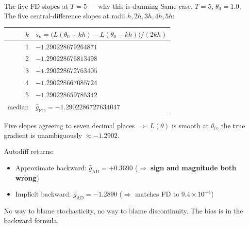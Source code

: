 \documentclass[10pt,aspectratio=169]{beamer}
\begin{document}
\begin{frame}{The five FD slopes at $T{=}5$ --- why this is damning}
  Same case, $T{=}5$, $\theta_0 = 1.0$. The five central-difference slopes at radii $h, 2h, 3h, 4h, 5h$:

  \medskip
  \begin{center}
  \footnotesize
  \begin{tabular}{r l}
    \toprule
    $k$ & $s_k = \big(L(\theta_0 + kh) - L(\theta_0 - kh)\big)/(2kh)$ \\
    \midrule
    1 & $-1.290228679264871$ \\
    2 & $-1.290228676813498$ \\
    3 & $-1.290228672763405$ \\
    4 & $-1.290228667085724$ \\
    5 & $-1.290228659785342$ \\
    \midrule
    median & $\widehat{g}_\text{FD} = -1.2902286727634047$ \\
    \bottomrule
  \end{tabular}
  \end{center}

  \medskip
  Five slopes agreeing to seven decimal places $\Rightarrow$ $L(\theta)$ is smooth at $\theta_0$, the true gradient is unambiguously $\approx -1.2902$.

  \medskip
  Autodiff returns:
  \begin{itemize}
    \item Approximate backward: $\widehat{g}_\text{AD} = +0.3690$ \quad ($\Rightarrow$ \textbf{sign and magnitude both wrong})
    \item Implicit backward: $\widehat{g}_\text{AD} = -1.2890$ \quad ($\Rightarrow$ matches FD to $9.4 \times 10^{-4}$)
  \end{itemize}

  \medskip
  No way to blame stochasticity, no way to blame discontinuity. The bias is in the backward formula.
\end{frame}

\end{document}
